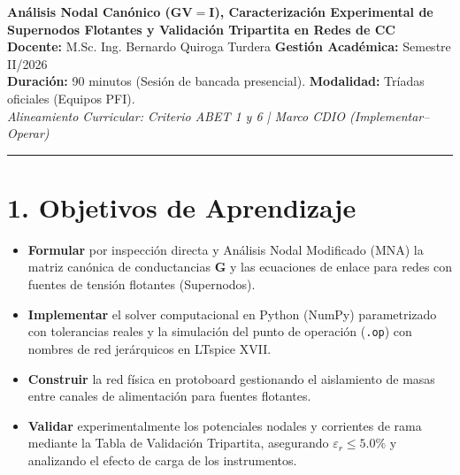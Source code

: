 \documentclass[11pt, a4paper]{article}
\begin{document}
\begin{center}
    {\Large \textbf{Análisis Nodal Canónico ($\mathbf{G}\mathbf{V} = \mathbf{I}$), Caracterización Experimental de Supernodos Flotantes y Validación Tripartita en Redes de CC}} \\[0.4cm]
    \normalsize
    \textbf{Docente:} M.Sc. Ing. Bernardo Quiroga Turdera \hspace{1cm} \textbf{Gestión Académica:} Semestre II/2026 \\
    \textbf{Duración:} 90 minutos (Sesión de bancada presencial). \hspace{0.5cm} \textbf{Modalidad:} Tríadas oficiales (Equipos PFI). \\[0.2cm]
    \textit{Alineamiento Curricular: Criterio ABET 1 y 6 | Marco CDIO (Implementar--Operar)}
    \vspace{0.3cm}
\end{center}

\hrule
\vspace{0.4cm}

\section{1. Objetivos de Aprendizaje}
\begin{itemize}[label=\textcolor{ucbblue}{\textbullet}, itemsep=2pt]
    \item \textbf{Formular} por inspección directa y Análisis Nodal Modificado (MNA) la matriz canónica de conductancias $\mathbf{G}$ y las ecuaciones de enlace para redes con fuentes de tensión flotantes (Supernodos).
    \item \textbf{Implementar} el solver computacional en Python (NumPy) parametrizado con tolerancias reales y la simulación del punto de operación (\texttt{.op}) con nombres de red jerárquicos en LTspice XVII.
    \item \textbf{Construir} la red física en protoboard gestionando el aislamiento de masas entre canales de alimentación para fuentes flotantes.
    \item \textbf{Validar} experimentalmente los potenciales nodales y corrientes de rama mediante la Tabla de Validación Tripartita, asegurando $\varepsilon_r \le 5.0\%$ y analizando el efecto de carga de los instrumentos.
\end{itemize}
\end{document}
